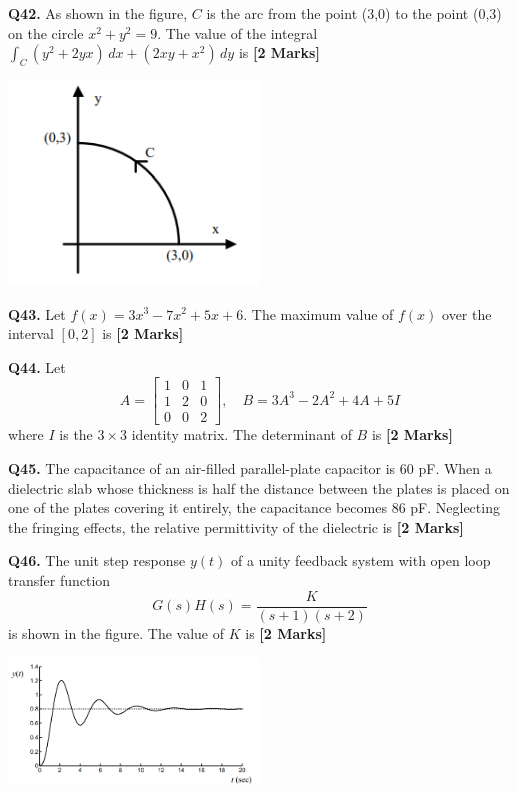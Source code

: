 \documentclass[11pt]{article}
\newcommand{\questionb}[2]{
    \noindent\textbf{Q#2.} #1 \hfill \textbf{[2 Marks]}
}
\begin{document}
\questionb{As shown in the figure, \( C \) is the arc from the point (3,0) to the point (0,3) on the circle \( x^2 + y^2 = 9 \). The value of the integral \( \int_C (y^2 + 2yx)\,dx + (2xy + x^2)\,dy \) is}{42}
\begin{center}
\includegraphics[width=0.5\textwidth]{figures/42.png}
\end{center}
\vspace{0.5cm}

\questionb{Let \( f(x) = 3x^3 - 7x^2 + 5x + 6 \). The maximum value of \( f(x) \) over the interval \([0, 2]\) is}{43}
\vspace{0.5cm}

\questionb{Let
\[
A = \begin{bmatrix}
1 & 0 & 1 \\
1 & 2 & 0 \\
0 & 0 & 2
\end{bmatrix}, \quad
B = 3A^3 - 2A^2 + 4A + 5I
\]
where \( I \) is the \( 3 \times 3 \) identity matrix. The determinant of \( B \) is}{44}
\vspace{0.5cm}

\questionb{The capacitance of an air-filled parallel-plate capacitor is 60 pF. When a dielectric slab whose thickness is half the distance between the plates is placed on one of the plates covering it entirely, the capacitance becomes 86 pF. Neglecting the fringing effects, the relative permittivity of the dielectric is}{45}
\vspace{0.5cm}

\questionb{The unit step response \( y(t) \) of a unity feedback system with open loop transfer function
\[
G(s)H(s) = \frac{K}{(s+1)(s+2)}
\]
is shown in the figure. The value of \( K \) is}{46}
\begin{center}
\includegraphics[width=0.5\textwidth]{figures/46.png}
\end{center}
\vspace{0.5cm}
\end{document}
